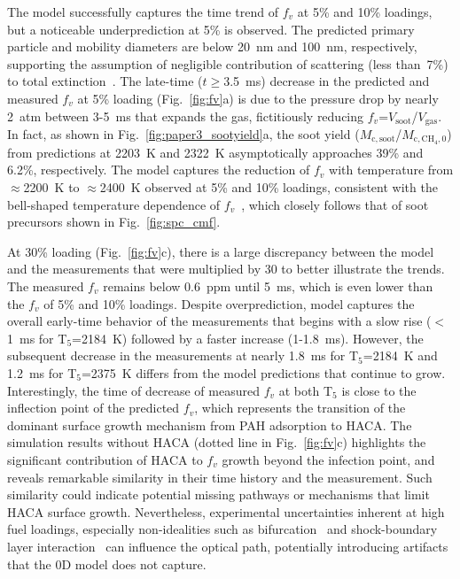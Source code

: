 

The model successfully captures the time trend of $f_v$ at 5\% and 10\% loadings, but a noticeable underprediction at 5\% is observed. The predicted primary particle and mobility diameters are below 20~nm and 100~nm, respectively, supporting the assumption of negligible contribution of scattering (less than~7\%) to total extinction~\citep{kelesidis2023mobility}. The late-time ($t$$\geq$3.5~ms) decrease in the predicted and measured $f_v$ at 5\% loading (Fig.~\ref{fig:fv}a) is due to the pressure drop by nearly 2~atm between 3-5~ms that expands the gas, fictitiously reducing $f_v$=$V_\mathrm{soot}$/$V_\mathrm{gas}$. In fact, as shown in Fig.~\ref{fig:paper3_sootyield}a, the soot yield ($M_\mathrm{c,soot}$/$M_\mathrm{c,CH_4,0}$) from predictions at 2203~K and 2322~K asymptotically approaches 39\% and 6.2\%, respectively. The model captures the reduction of $f_v$ with temperature from $\approx$2200~K to $\approx$2400~K observed at 5\% and 10\% loadings, consistent with the bell-shaped temperature dependence of $f_v$~\citep{agafonov2016unified}, which closely follows that of soot precursors shown in Fig.~\ref{fig:spc_cmf}.


At 30\% loading (Fig.~\ref{fig:fv}c), there is a large discrepancy between the model and the measurements that were multiplied by 30 to better illustrate the trends. The measured $f_v$ remains below 0.6~ppm until 5~ms, which is even lower than the $f_v$ of 5\% and 10\% loadings. 
Despite overprediction, model captures the overall early-time behavior of the measurements that begins with a slow rise ($<$1~ms for T$_5$=2184~K) followed by a faster increase (1-1.8~ms).
However, the subsequent decrease in the measurements at nearly 1.8~ms for T$_5$=2184~K and 1.2~ms for T$_5$=2375~K differs from the model predictions that continue to grow. Interestingly, the time of decrease of measured $f_v$ at both T$_5$ is close to the inflection point of the predicted $f_v$, which represents the transition of the dominant surface growth mechanism from PAH adsorption to HACA. The simulation results without HACA (dotted line in Fig.~\ref{fig:fv}c) highlights the significant contribution of HACA to $f_v$ growth beyond the infection point, and reveals remarkable similarity in their time history and the measurement. Such similarity could indicate potential missing pathways or mechanisms that limit HACA surface growth.  Nevertheless, experimental uncertainties inherent at high fuel loadings, especially non-idealities such as bifurcation~\citep{petersen2006measurement} and shock-boundary layer interaction~\citep{grogan2017regimes} can influence the optical path, potentially introducing artifacts that the 0D model does not capture.


